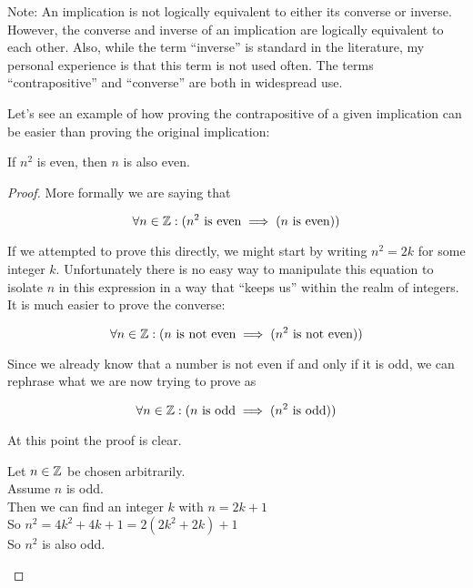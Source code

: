 Note:  An implication is not logically equivalent to either its converse or inverse.  However, the converse and inverse of an implication are logically equivalent to each other.  Also, while the term ``inverse'' is standard in the literature, my personal experience is that this term is not used often.  The terms ``contrapositive'' and ``converse'' are both in widespread use.

Let's see an example of how proving the contrapositive of a given implication can be easier than proving the original implication:

\begin{example}
		If $n^2$ is even, then $n$ is also even.
		
		\begin{proof}
				More formally we are saying that 
				
				\[
				\forall n \in \mathbb{Z}: (n^2 \textrm{ is even} \implies (n \textrm{ is even}))
				\]
				
				If we attempted to prove this directly, we might start by writing $n^2 = 2k$ for some integer $k$.  Unfortunately there is no easy way to manipulate this equation to isolate $n$ in this expression in a way that ``keeps us'' within the realm of integers.  It is much easier to prove the converse:
				
				\[
				\forall n \in \mathbb{Z}: (n\textrm{ is not even} \implies (n^2 \textrm{ is not even}))
				\]
				
				Since we already know that a number is not even if and only if it is odd, we can rephrase what we are now trying to prove as
				
				\[
				\forall n \in \mathbb{Z}: (n \textrm{ is odd} \implies (n^2 \textrm{ is odd}))
				\]
				
				At this point the proof is clear.
				
				\begin{fitch}
				\textrm{Let $n \in \mathbb{Z}$ be chosen arbitrarily.}\\
				\textrm{Assume $n$ is odd.}\\
				\fa \textrm{ Then we can find an integer $k$ with $n = 2k+1$}\\
				\fa \textrm{  So $n^2 = 4k^2 +4k+1 = 2(2k^2+2k) + 1$}\\
				\fa \textrm{ So $n^2$ is also odd.}
				\end{fitch}
				
			\end{proof}
	\end{example}

